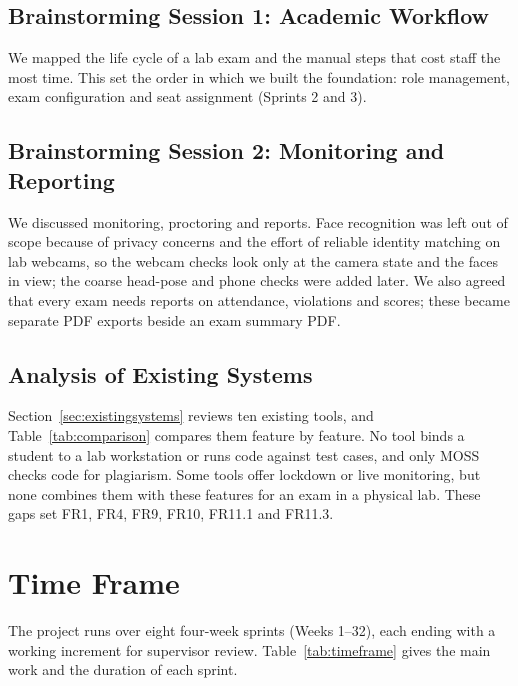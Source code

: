 \subsection{Brainstorming Session 1: Academic Workflow}
We mapped the life cycle of a lab exam and the manual steps that cost staff the most time. This set the order in which we built the foundation: role management, exam configuration and seat assignment (Sprints 2 and 3).

\subsection{Brainstorming Session 2: Monitoring and Reporting}
We discussed monitoring, proctoring and reports. Face recognition was left out of scope because of privacy concerns and the effort of reliable identity matching on lab webcams, so the webcam checks look only at the camera state and the faces in view; the coarse head-pose and phone checks were added later. We also agreed that every exam needs reports on attendance, violations and scores; these became separate PDF exports beside an exam summary PDF.

\subsection{Analysis of Existing Systems}
Section~\ref{sec:existingsystems} reviews ten existing tools, and Table~\ref{tab:comparison} compares them feature by feature. No tool binds a student to a lab workstation or runs code against test cases, and only MOSS checks code for plagiarism. Some tools offer lockdown or live monitoring, but none combines them with these features for an exam in a physical lab. These gaps set FR1, FR4, FR9, FR10, FR11.1 and FR11.3.

\section{Time Frame}
The project runs over eight four-week sprints (Weeks 1--32), each ending with a working increment for supervisor review. Table~\ref{tab:timeframe} gives the main work and the duration of each sprint.

